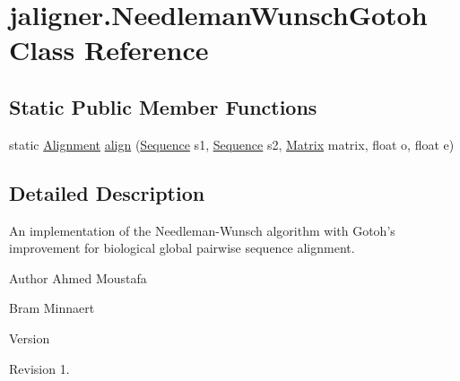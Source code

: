 \hypertarget{classjaligner_1_1_needleman_wunsch_gotoh}{\section{jaligner.\+Needleman\+Wunsch\+Gotoh Class Reference}
\label{classjaligner_1_1_needleman_wunsch_gotoh}
}
\subsection*{Static Public Member Functions}
\begin{DoxyCompactItemize}
\item 
static \hyperlink{classjaligner_1_1_alignment}{Alignment} \hyperlink{classjaligner_1_1_needleman_wunsch_gotoh_ad306f9d40bb0f1f8169a38b01a546342}{align} (\hyperlink{classjaligner_1_1_sequence}{Sequence} s1, \hyperlink{classjaligner_1_1_sequence}{Sequence} s2, \hyperlink{classjaligner_1_1matrix_1_1_matrix}{Matrix} matrix, float o, float e)
\end{DoxyCompactItemize}


\subsection{Detailed Description}
An implementation of the Needleman-\/\+Wunsch algorithm with Gotoh's improvement for biological global pairwise sequence alignment.

\begin{DoxyAuthor}{Author}
Ahmed Moustafa 

Bram Minnaert 
\end{DoxyAuthor}
\begin{DoxyVersion}{Version}

\end{DoxyVersion}
\begin{DoxyParagraph}{Revision}
1. 
\end{DoxyParagraph}


